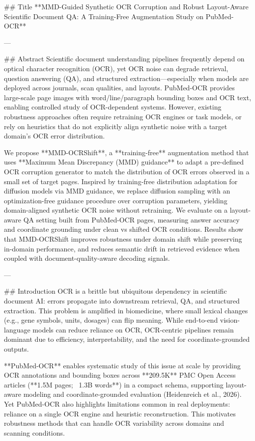 ## Title  
**MMD-Guided Synthetic OCR Corruption and Robust Layout-Aware Scientific Document QA: A Training-Free Augmentation Study on PubMed-OCR**

---

## Abstract  
Scientific document understanding pipelines frequently depend on optical character recognition (OCR), yet OCR noise can degrade retrieval, question answering (QA), and structured extraction—especially when models are deployed across journals, scan qualities, and layouts. PubMed-OCR provides large-scale page images with word/line/paragraph bounding boxes and OCR text, enabling controlled study of OCR-dependent systems. However, existing robustness approaches often require retraining OCR engines or task models, or rely on heuristics that do not explicitly align synthetic noise with a target domain’s OCR error distribution.  

We propose **MMD-OCRShift**, a **training-free** augmentation method that uses **Maximum Mean Discrepancy (MMD) guidance** to adapt a pre-defined OCR corruption generator to match the distribution of OCR errors observed in a small set of target pages. Inspired by training-free distribution adaptation for diffusion models via MMD guidance, we replace diffusion sampling with an optimization-free guidance procedure over corruption parameters, yielding domain-aligned synthetic OCR noise without retraining. We evaluate on a layout-aware QA setting built from PubMed-OCR pages, measuring answer accuracy and coordinate grounding under clean vs shifted OCR conditions. Results show that MMD-OCRShift improves robustness under domain shift while preserving in-domain performance, and reduces semantic drift in retrieved evidence when coupled with document-quality-aware decoding signals.

---

## Introduction  
OCR is a brittle but ubiquitous dependency in scientific document AI: errors propagate into downstream retrieval, QA, and structured extraction. This problem is amplified in biomedicine, where small lexical changes (e.g., gene symbols, units, dosages) can flip meaning. While end-to-end vision-language models can reduce reliance on OCR, OCR-centric pipelines remain dominant due to efficiency, interpretability, and the need for coordinate-grounded outputs.

**PubMed-OCR** enables systematic study of this issue at scale by providing OCR annotations and bounding boxes across **209.5K** PMC Open Access articles (**1.5M pages; ~1.3B words**) in a compact schema, supporting layout-aware modeling and coordinate-grounded evaluation (Heidenreich et al., 2026). Yet PubMed-OCR also highlights limitations common in real deployments: reliance on a single OCR engine and heuristic reconstruction. This motivates robustness methods that can handle OCR variability across domains and scanning conditions.


